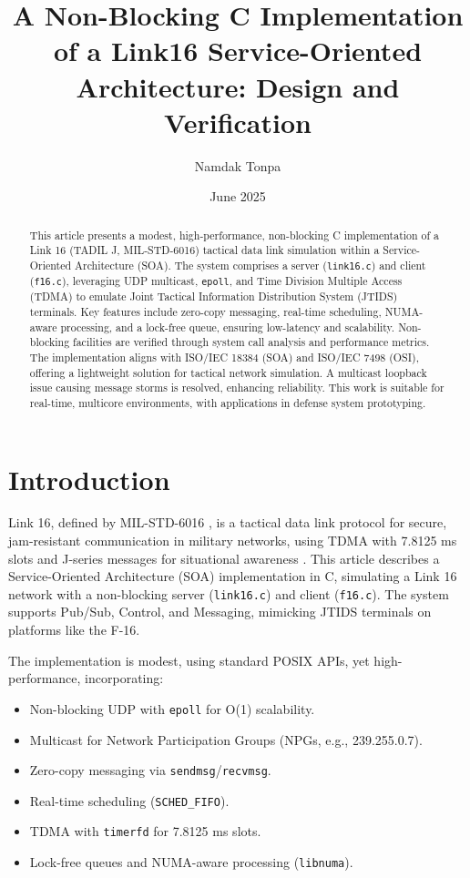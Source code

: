 \documentclass{article}
\title{A Non-Blocking C Implementation of a Link16 Service-Oriented Architecture: Design and Verification}
\author{Namdak Tonpa}
\date{June 2025}
\begin{document}
\maketitle

\begin{abstract}
This article presents a modest, high-performance, non-blocking C implementation of a Link 16 (TADIL J, MIL-STD-6016) tactical data link simulation within a Service-Oriented Architecture (SOA). The system comprises a server (\texttt{link16.c}) and client (\texttt{f16.c}), leveraging UDP multicast, \texttt{epoll}, and Time Division Multiple Access (TDMA) to emulate Joint Tactical Information Distribution System (JTIDS) terminals. Key features include zero-copy messaging, real-time scheduling, NUMA-aware processing, and a lock-free queue, ensuring low-latency and scalability. Non-blocking facilities are verified through system call analysis and performance metrics. The implementation aligns with ISO/IEC 18384 (SOA) and ISO/IEC 7498 (OSI), offering a lightweight solution for tactical network simulation. A multicast loopback issue causing message storms is resolved, enhancing reliability. This work is suitable for real-time, multicore environments, with applications in defense system prototyping.
\end{abstract}

\tableofcontents

\section{Introduction}
Link 16, defined by MIL-STD-6016 \cite{milstd6016}, is a tactical data link protocol for secure, jam-resistant communication in military networks, using TDMA with 7.8125 ms slots and J-series messages for situational awareness \cite{ada404334}. This article describes a Service-Oriented Architecture (SOA) implementation in C, simulating a Link 16 network with a non-blocking server (\texttt{link16.c}) and client (\texttt{f16.c}). The system supports Pub/Sub, Control, and Messaging, mimicking JTIDS terminals on platforms like the F-16.

The implementation is modest, using standard POSIX APIs, yet high-performance, incorporating:
\begin{itemize}
    \item Non-blocking UDP with \texttt{epoll} for O(1) scalability.
    \item Multicast for Network Participation Groups (NPGs, e.g., 239.255.0.7).
    \item Zero-copy messaging via \texttt{sendmsg}/\texttt{recvmsg}.
    \item Real-time scheduling (\texttt{SCHED\_FIFO}).
    \item TDMA with \texttt{timerfd} for 7.8125 ms slots.
    \item Lock-free queues and NUMA-aware processing (\texttt{libnuma}).
\end{itemize}
\end{document}
